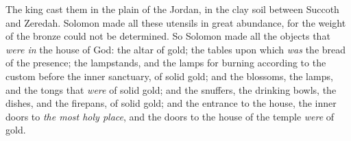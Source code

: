 \begin{biblechapter}
\verse The king cast them in the plain of the Jordan, in the clay soil between Succoth and Zeredah.
\verse Solomon made all these utensils in great abundance, for the weight of the bronze could not be determined.
\verse So Solomon made all the objects that \textit{were in} the house of God: the altar of gold; the tables upon which \textit{was} the bread of the presence;
\verse the lampstands, and the lamps for burning according to the custom before the inner sanctuary, of solid gold;
\verse and the blossoms, the lamps, and the tongs that \textit{were} of solid gold;
\verse and the snuffers, the drinking bowls, the dishes, and the firepans, of solid gold; and the entrance to the house, the inner doors to \textit{the most holy place}, and the doors to the house of the temple \textit{were} of gold.
\end{biblechapter}

